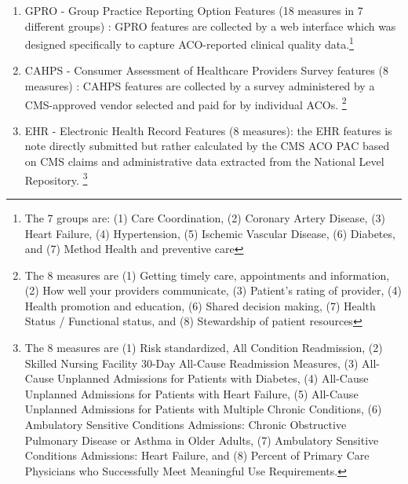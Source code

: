 \documentclass[conference]{IEEEtran}
\begin{document}
\begin{enumerate}
\item GPRO - Group Practice Reporting Option Features (18 measures in 7 different groups) : GPRO features are collected by a web interface which was designed specifically to capture ACO-reported clinical quality data.\footnote{The 7 groups are: (1) Care Coordination, (2) Coronary Artery Disease, (3) Heart Failure, (4) Hypertension, (5) Ischemic Vascular Disease, (6) Diabetes, and (7) Method Health and preventive care}



\item CAHPS - Consumer Assessment of Healthcare Providers Survey features (8 measures) : CAHPS features
are collected by a survey administered by a CMS-approved vendor selected and paid for by individual ACOs. \footnote {The 8 measures are (1) Getting timely care, appointments and information, (2) How well your providers communicate, (3) Patient's rating of provider, (4) Health promotion and education, (6) Shared decision making, (7) Health Status / Functional status, and  (8) Stewardship of patient resources}


\item EHR - Electronic Health Record Features (8 measures): the EHR features is note directly submitted but rather
 calculated by the CMS ACO PAC based on CMS claims and administrative data extracted from the National Level Repository. \footnote{The 8 measures are 
(1) Risk standardized, All Condition Readmission,
(2) Skilled Nursing Facility 30-Day All-Cause Readmission Measures,
(3) All-Cause Unplanned Admissions for Patients with Diabetes,
(4) All-Cause Unplanned Admissions for Patients with Heart Failure, 
(5) All-Cause Unplanned Admissions for Patients with Multiple Chronic Conditions, 
(6)	Ambulatory Sensitive Conditions Admissions: Chronic Obstructive Pulmonary Disease or Asthma in Older Adults, 
(7) Ambulatory Sensitive Conditions Admissions: Heart Failure,  and 
(8) Percent of Primary Care Physicians who Successfully Meet Meaningful Use Requirements.} 

\end{enumerate}
\end{document}
